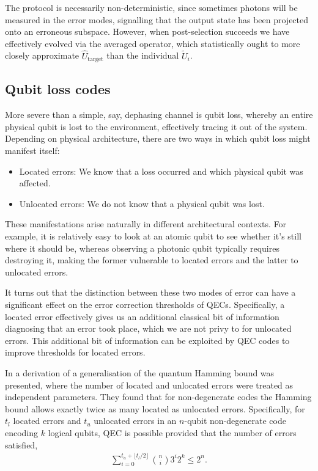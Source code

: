 The protocol is necessarily non-deterministic, since sometimes photons will be measured in the error modes, signalling that the output state has been projected onto an erroneous subspace. However, when post-selection succeeds we have effectively evolved via the averaged operator, which statistically ought to more closely approximate $\hat{U}_\text{target}$ than the individual $\tilde{U}_i$.

%
%

\subsection{Qubit loss codes}

More severe than a simple, say, dephasing channel is qubit loss, whereby an entire physical qubit is lost to the environment, effectively tracing it out of the system. Depending on physical architecture, there are two ways in which qubit loss might manifest itself:
\begin{itemize}
\item Located errors: We know that a loss occurred and which physical qubit was affected.
\item Unlocated errors: We do not know that a physical qubit was lost.
\end{itemize}

These manifestations arise naturally in different architectural contexts. For example, it is relatively easy to look at an atomic qubit to see whether it's still where it should be, whereas observing a photonic qubit typically requires destroying it, making the former vulnerable to located errors and the latter to unlocated errors.

It turns out that the distinction between these two modes of error can have a significant effect on the error correction thresholds of QECs. Specifically, a located error effectively gives us an additional classical bit of information diagnosing that an error took place, which we are not privy to for unlocated errors. This additional bit of information can be exploited by QEC codes to improve thresholds for located errors.

In \cite{RohdeHaselgrove} a derivation of a generalisation of the quantum Hamming bound was presented, where the number of located and unlocated errors were treated as independent parameters. They found that for non-degenerate codes the Hamming bound allows exactly twice as many located as unlocated errors. Specifically, for $t_l$ located errors and $t_u$ unlocated errors in an $n$-qubit non-degenerate code encoding $k$ logical qubits, QEC is possible provided that the number of errors satisfied,
\begin{align}
\sum_{i=0}^{t_u + \lfloor t_l/2 \rfloor} \binom{n}{i}3^i 2^k \leq 2^n.
\end{align}

